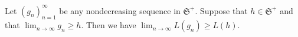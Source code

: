 Let $(g_n)_{n=1}^{\infty}$ be any nondecreasing sequence in $\mathfrak{S}^+$. Suppose that $h \in \mathfrak{S}^+$ and that $\lim_{n \to \infty} g_n \geq h$. Then we have $\lim_{n \to \infty} L(g_n) \geq L(h)$.